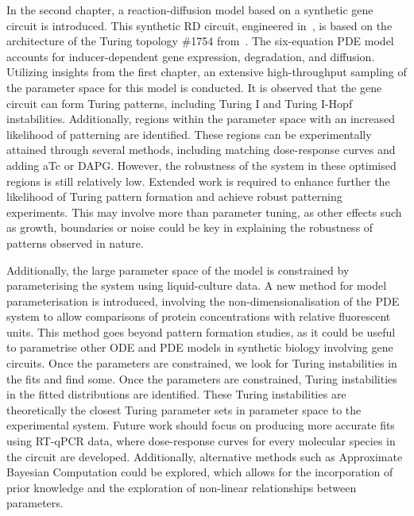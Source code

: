 In the second chapter, a reaction-diffusion model based on a synthetic gene circuit is introduced.
This synthetic RD circuit, engineered in~\cite{Tica2020}, is based on the architecture of the Turing topology \#1754 from~\cite{Scholes2019}.
The six-equation PDE model accounts for inducer-dependent gene expression, degradation, and diffusion.
Utilizing insights from the first chapter, an extensive high-throughput sampling of the parameter space for this model is conducted.
It is observed that the gene circuit can form Turing patterns, including Turing I and Turing I-Hopf instabilities.
Additionally, regions within the parameter space with an increased likelihood of patterning are identified.
These regions can be experimentally attained through several methods, including matching dose-response curves and adding aTc or DAPG.
However, the robustness of the system in these optimised regions is still relatively low.
Extended work is required to enhance further the likelihood of Turing pattern formation and achieve robust patterning experiments.
This may involve more than parameter tuning, as other effects such as growth, boundaries or noise could be key in explaining the robustness of patterns observed in nature.

Additionally, the large parameter space of the model is constrained by parameterising the system using liquid-culture data.
A new method for model parameterisation is introduced, involving the non-dimensionalisation of the PDE system to allow comparisons of protein concentrations with relative fluorescent units.
This method goes beyond pattern formation studies, as it could be useful to parametrise other ODE and PDE models in synthetic biology involving gene circuits.
Once the parameters are constrained, we look for Turing instabilities in the fits and find some.
Once the parameters are constrained, Turing instabilities in the fitted distributions are identified.
These Turing instabilities are theoretically the closest Turing parameter sets in parameter space to the experimental system.
Future work should focus on producing more accurate fits using RT-qPCR data, where dose-response curves for every molecular species in the circuit are developed.
Additionally, alternative methods such as Approximate Bayesian Computation could be explored, which allows for the incorporation of prior knowledge and the exploration of non-linear relationships between parameters.

